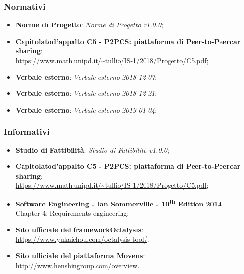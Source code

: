 \subsubsection{Normativi}
\begin{itemize}
	\item \textbf{Norme di Progetto}: \textit{Norme di Progetto v1.0.0};

	\item \textbf{Capitolato\glosp d'appalto C5 - P2PCS: piattaforma di Peer-to-Peer\glosp car sharing}: \\ \url{ https://www.math.unipd.it/~tullio/IS-1/2018/Progetto/C5.pdf};
	\item \textbf{Verbale esterno}: \textit{Verbale esterno 2018-12-07};
	\item \textbf{Verbale esterno}: \textit{Verbale esterno 2018-12-21};
	\item \textbf{Verbale esterno}: \textit{Verbale esterno 2019-01-04};
\end{itemize}
\subsubsection{Informativi}
\begin{itemize}
	\item \textbf{Studio di Fattibilità}: \textit{Studio di Fattibilità v1.0.0};
	\item \textbf{Capitolato\glosp d'appalto C5 - P2PCS: piattaforma di Peer-to-Peer\glosp car sharing}: \\ \url{ https://www.math.unipd.it/~tullio/IS-1/2018/Progetto/C5.pdf};
	\item \textbf{Software Engineering - Ian Sommerville - 10\textsuperscript{th} Edition 2014}
	\subitem - Chapter 4: Requirements engineering;
	\item \textbf{Sito ufficiale del framework\glosp Octalysis\glo}: \\ \textsf{\url{https://www.yukaichou.com/octalysis-tool/}}. 
	\item \textbf{Sito ufficiale del piattaforma Movens\glo}: \\ \textsf{\url{http://www.henshingroup.com/overview}}. 

\end{itemize}